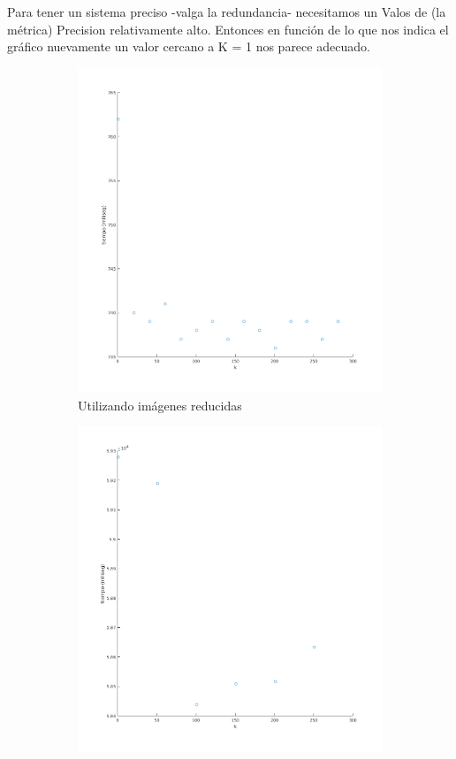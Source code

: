 Para tener un sistema preciso -valga la redundancia- necesitamos un Valos de (la métrica) Precision relativamente alto. Entonces en función de lo que nos indica el gráfico nuevamente un valor cercano a K = 1 nos parece adecuado.
\begin{figure}[H]
\begin{subfigure}[h]{0.62\linewidth}
\includegraphics[width=\linewidth]{img/k_knn_tiempo.png}
\caption{Utilizando imágenes reducidas}
\end{subfigure}
\hfill
\begin{subfigure}[h]{0.62\linewidth}
\includegraphics[width=\linewidth]{img/big_k_knn_tiempo.png}

\end{subfigure}
\end{figure}
